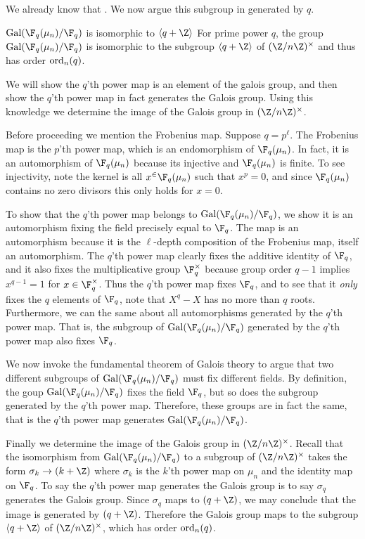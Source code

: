 We already know that .
We now argue this subgroup in generated by $q$.

\begin{theorem}{$\Gal(\F_q(\mu_n)/\F_q)$ is isomorphic to $\langle q+\Z\rangle$}
    For prime power $q$, the group $\Gal(\F_q(\mu_n)/\F_q)$ is isomorphic to the subgroup $\langle q+\Z\rangle$ of $(\Z/n\Z)^\times$ and thus has order $\text{ord}_n(q)$.

    \proof
    We will show the $q$'th power map is an element of the galois group, and then show the $q$'th power map in fact generates the Galois group.
    Using this knowledge we determine the image of the Galois group in $(\Z/n\Z)^\times$.

    Before proceeding we mention the Frobenius map.
    Suppose $q=p^\ell$.
    The Frobenius map is the $p$'th power map, which is an endomorphism of $\F_q(\mu_n)$.
    In fact, it is an automorphism of $\F_q(\mu_n)$ because its injective and $\F_q(\mu_n)$ is finite.
    To see injectivity, note the kernel is all $x^\in\F_q(\mu_n)$ such that $x^p=0$, and since $\F_q(\mu_n)$ contains no zero divisors this only holds for $x=0$.

    To show that the $q$'th power map belongs to $\Gal(\F_q(\mu_n)/\F_q)$, we show it is an automorphism fixing the field precisely equal to $\F_q$.
    The map is an automorphism because it is the $\ell$-depth composition of the Frobenius map, itself an automorphism.
    The $q$'th power map clearly fixes the additive identity of $\F_q$, and it also fixes the multiplicative group $\F_q^\times$ because group order $q-1$ implies $x^{q-1}=1$ for $x\in\F_q^\times$.
    Thus the $q$'th power map fixes $\F_q$, and to see that it \emph{only} fixes the $q$ elements of $\F_q$, note that $X^q-X$ has no more than $q$ roots.
    Furthermore, we can the same about all automorphisms generated by the $q$'th power map. 
    That is, the subgroup of $\Gal(\F_q(\mu_n)/\F_q)$ generated by the $q$'th power map also fixes $\F_q$.

    We now invoke the fundamental theorem of Galois theory to argue that two different subgroups of $\Gal(\F_q(\mu_n)/\F_q)$ must fix different fields.
    By definition, the goup $\Gal(\F_q(\mu_n)/\F_q)$ fixes the field $\F_q$, but so does the subgroup generated by the $q$'th power map.
    Therefore, these groups are in fact the same, that is the $q$'th power map generates $\Gal(\F_q(\mu_n)/\F_q)$.

    Finally we determine the image of the Galois group in $(\Z/n\Z)^\times$.
    Recall that the isomorphism from $\Gal(\F_q(\mu_n)/\F_q)$ to a subgroup of $(\Z/n\Z)^\times$ takes the form $\sigma_k\to(k+\Z)$ where $\sigma_k$ is the $k$'th power map on $\mu_n$ and the identity map on $\F_q$.
    To say the $q$'th power map generates the Galois group is to say $\sigma_q$ generates the Galois group.
    Since $\sigma_q$ maps to $(q+\Z)$, we may conclude that the image is generated by $(q+\Z)$.
    Therefore the Galois group maps to the subgroup $\langle q+\Z\rangle$ of $(\Z/n\Z)^\times$, which has order $\text{ord}_n(q)$.
\end{theorem}

